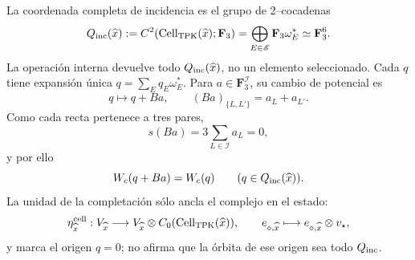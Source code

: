 La coordenada completa de incidencia es el grupo de 2--cocadenas
\begin{equation}
\label{eq:pdfv2-cor-q-incidencia-total}
 Q_{\rm inc}(\widehat x):=
 C^2(\operatorname{Cell}_{\rm TPK}(\widehat x);\mathbf F_3)
 =\bigoplus_{E\in\mathscr E}\mathbf F_3\omega_E^*
 \simeq\mathbf F_3^6.
\end{equation}
La operación interna devuelve todo \(Q_{\rm inc}(\widehat x)\), no un
elemento seleccionado. Cada \(q\) tiene expansión única
\(q=\sum_Eq_E\omega_E^*\). Para
\(a\in\mathbf F_3^{\mathscr I}\), su cambio de potencial es
\begin{equation}
\label{eq:pdfv2-cor-collar-variacion}
 q\longmapsto q+Ba,\qquad (Ba)_{\{L,L'\}}=a_L+a_{L'}.
\end{equation}
Como cada recta pertenece a tres pares,
\[
 s(Ba)=3\sum_{L\in\mathscr I}a_L=0,
\]
y por ello
\begin{equation}
\label{eq:pdfv2-cor-wc-invariante-celular}
 W_c(q+Ba)=W_c(q)\qquad(q\in Q_{\rm inc}(\widehat x)).
\end{equation}
La unidad de la completación sólo ancla el complejo en el estado:
\begin{equation}
\label{eq:pdfv2-cor-cell-unidad}
 \eta^{\rm cell}_{\widehat x}:V_{\widehat x}\longrightarrow
 V_{\widehat x}\otimes C_0(\operatorname{Cell}_{\rm TPK}(\widehat x)),\qquad
 e_{\diamond,\widehat x}\longmapsto
 e_{\diamond,\widehat x}\otimes v_\star,
\end{equation}
y marca el origen \(q=0\); no afirma que la órbita de ese origen sea todo
\(Q_{\rm inc}\).

